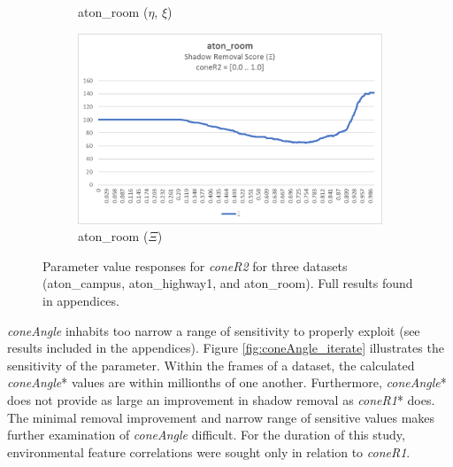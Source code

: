 \begin{figure}
\begin{subfigure}{.45\linewidth}
  \caption{aton\_room ($\eta$, $\xi$)}
\end{subfigure}
\hfill
\begin{subfigure}{.45\linewidth}
  \includegraphics[width=1\linewidth]{figures/room_coneR2_score.jpg}
  \caption{aton\_room ($\Xi$)}
\end{subfigure}

\caption{Parameter value responses for \textit{coneR2} for three datasets (aton\_campus, aton\_highway1, and aton\_room). Full results found in appendices.}
\label{fig:coneR2_iterate}
\end{figure}

\textit{coneAngle} inhabits too narrow a range of sensitivity to properly exploit (see results included in the appendices). Figure \ref{fig:coneAngle_iterate} illustrates the sensitivity of the parameter. Within the frames of a dataset, the calculated \textit{coneAngle}* values are within millionths of one another. Furthermore, \textit{coneAngle}* does not provide as large an improvement in shadow removal as \textit{coneR1}* does. The minimal removal improvement and narrow range of sensitive values makes further examination of \textit{coneAngle} difficult. For the duration of this study, environmental feature correlations were sought only in relation to \textit{coneR1}.

